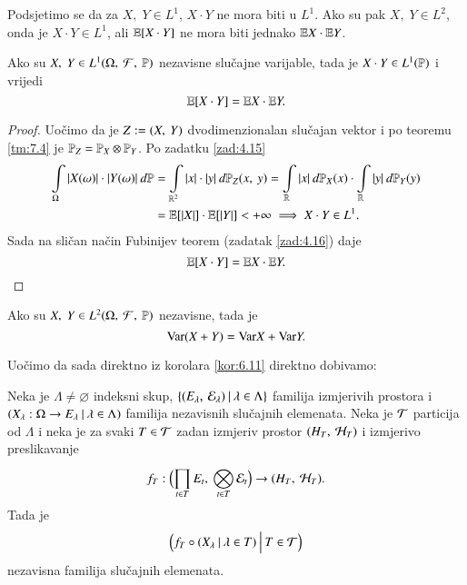 Podsjetimo se da za $X, \; Y \in L^1$, $X \cdot Y$ ne mora biti u $L^1$. Ako su pak $X, \; Y \in L^2$, onda je $X \cdot Y \in L^1$, ali $\mathbb{E} [X \cdot Y]$ ne mora biti jednako $\mathbb{E} X \cdot \mathbb{E} Y$.

\begin{tm}  \label{tm:7.7}
    Ako su $X, \; Y \in L^1 (\Omega, \: \mathcal{F}, \: \mathbb{P})$ nezavisne slu\v cajne varijable, tada je $X \cdot Y \in L^1(\mathbb{P})$ i vrijedi
    \begin{equation*}
        \mathbb{E} [X \cdot Y] = \mathbb{E} X \cdot \mathbb{E} Y.
    \end{equation*}
\end{tm}

\begin{proof}
    Uo\v cimo da je $Z:=({X}, \: {Y})$ dvodimenzionalan slu\v cajan vektor i po teoremu \ref{tm:7.4} je $\mathbb{P}_Z = \mathbb{P}_X \otimes \mathbb{P}_Y$.
    Po zadatku \ref{zad:4.15}
    \begin{align*}
        \int\limits_\Omega |X(\omega)| \cdot |Y(\omega)| \: d \mathbb{P}
        &= \int\limits_{\mathbb{R}^2} |x| \cdot |y| \: d \mathbb{P}_Z ({x}, \: {y}) = \int\limits_{\mathbb{R}} |x| \: d \mathbb{P}_X (x) \cdot \int\limits_{\mathbb{R}} |y| \: d \mathbb{P}_Y (y)\\
        &= \mathbb{E} [|X|] \cdot \mathbb{E} [|Y|] < +\infty \implies X \cdot Y \in L^1.
    \end{align*}
    Sada na sli\v can na\v cin Fubinijev teorem (zadatak \ref{zad:4.16}) daje
    \begin{equation*}
        \mathbb{E} [X \cdot Y] = \mathbb{E} X \cdot \mathbb{E} Y.
    \end{equation*}
\end{proof}

\begin{zad} \label{zad:7.8}
    Ako su $X, \; Y \in L^2 (\Omega, \: \mathcal{F}, \: \mathbb{P})$ nezavisne, tada je
    \begin{equation*}
        \mathrm{Var} (X + Y) = \mathrm{Var} X + \mathrm{Var} Y.
    \end{equation*}
\end{zad}

Uo\v cimo da sada direktno iz korolara \ref{kor:6.11} direktno dobivamo:

\begin{kor} \label{kor:7.9}
    Neka je $\Lambda \neq  \varnothing$ indeksni skup, $\{{({E_\lambda}, \: {\mathcal{E}_\lambda})} \: | \: {\lambda \in \Lambda}\}$ familija izmjerivih prostora i $({X_\lambda : \Omega \to E_\lambda} \: | \: {\lambda \in \Lambda})$ familija nezavisnih slu\v cajnih elemenata.
    Neka je $\mathcal{T}$ particija od $\Lambda$ i neka je za svaki $T \in \mathcal{T}$ zadan izmjeriv prostor $({H_T}, \: {\mathcal{H}_T})$ i izmjerivo preslikavanje
    \begin{equation*}
        f_T : \Big( {\prod\limits_{t \in T}^{} E_t}, \: {\bigotimes\limits_{t \in T}^{} \mathcal{E}_t} \Big) \to ({H_T}, \: {\mathcal{H}_T}).
    \end{equation*}
    Tada je
    \begin{equation*}
        \Big( {f_T \circ ({X_\lambda} \: | \: {\lambda \in T})} \: \Big| \: {T \in \mathcal{T}} \Big)    
    \end{equation*}
    nezavisna familija slu\v cajnih elemenata.
\end{kor}

